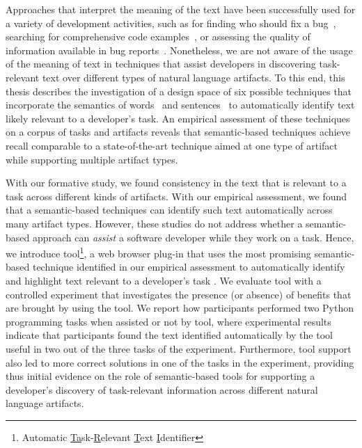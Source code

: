 Approaches that interpret the meaning of the text have been successfully used for a variety of development activities,
such as for finding who should fix a bug~\cite{yang2016}, searching for comprehensive code examples~\cite{silva2019}, or assessing the quality of information available in bug reports~\cite{chaparro2019}.
Nonetheless, we are not aware of the usage of the meaning of text in techniques 
that assist developers in discovering task-relevant text over different types of natural language artifacts.
To this end, this thesis describes the investigation of a design space
of six possible techniques that incorporate the semantics of words~\cite{Mikolov2013, Devlin2018Bert}
and sentences~\cite{fillmore1976frame, marques2021}
to automatically identify text likely relevant to a developer's task.
An empirical assessment of these techniques 
on a corpus of tasks
and artifacts reveals that semantic-based techniques
achieve recall comparable to a state-of-the-art technique aimed at one type of artifact~\cite{Xu2017}
while supporting
multiple artifact types.






With our formative study, we found consistency in the text  that is relevant to a task across different kinds of artifacts.
With our empirical assessment, we found that a semantic-based techniques can identify such text
automatically across many artifact types.
However, these studies do not address whether a semantic-based approach can \textit{assist} a software developer while they work on a task.
Hence, we introduce \acs{tool}\footnote{
    Automatic \underline{Ta}sk-\underline{R}elevant \underline{T}ext \underline{I}dentifier
}, a web browser plug-in that 
uses the most promising semantic-based technique identified in our empirical assessment
to automatically identify and highlight text relevant to a developer's task .
We evaluate \acs{tool} with a controlled experiment that investigates the presence (or absence) of benefits that are brought by using the tool.
We report how  participants 
performed two Python programming tasks when 
 assisted or not by \acs{tool},
where experimental results indicate that participants found the text identified automatically
by the tool 
useful in two out of the three tasks of the experiment.
Furthermore, tool support also led to more correct solutions 
in one of the tasks in the experiment, providing thus
initial evidence on the role of semantic-based tools 
for supporting a developer's discovery of task-relevant information
across different natural language artifacts.
